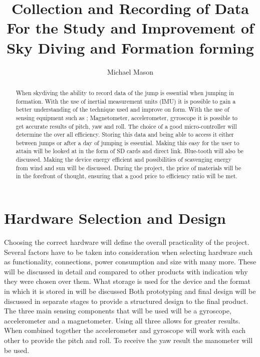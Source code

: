 \documentclass{report}
\begin{document}
\title{Collection and Recording of Data For the Study and Improvement of Sky Diving and Formation forming}
\author{Michael Mason}

\maketitle


\begin{abstract}
When skydiving the ability to record data of the jump is essential when jumping in formation. With the use of inertial measurement units (IMU) it is possible to gain a better understanding of the technique used and improve on form. With the use of sensing equipment such as ; Magnetometer, accelerometer, gyroscope it is possible to get accurate results of pitch, yaw and roll. The choice of a good micro-controller will determine the over all efficiency.
Storing this data and being able to access it either between jumps or after a day of jumping is essential. Making this easy for the user to attain will be looked at in the form of SD cards and direct link. Blue-tooth will also be discussed.
Making the device energy efficient and possibilities of scavenging energy from wind and sun will be discussed. During the project, the price of materials will be in the forefront of thought, ensuring that a good price to efficiency ratio will be met.

\end{abstract}

\tableofcontents



\chapter{Hardware Selection and Design}
Choosing the correct hardware will define the overall practicality of the project. Several factors have to be taken into consideration when selecting hardware such as functionality, connections, power consumption and size with many more. These will be discussed in detail and compared to other products with indication why they were chosen over them. What storage is used for the device and the format in which it is stored in will be discussed
Both prototyping and final design will be discussed in separate stages to provide a structured design to the final product.
The three main sensing components that will be used will be a gyroscope, accelerometer and a magnetometer. Using all three allows for greater results. When combined together the accelerometer and gyroscope will work with each other to provide the pitch and roll. To receive the yaw result the manometer will be used.
\end{document}
